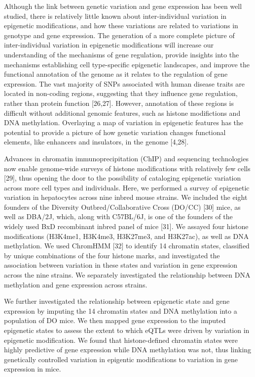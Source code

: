 \documentclass{bmcart}
\begin{document}
Although the link between genetic variation and gene expression has been
well studied, there is relatively little known about inter-individual
variation in epigenetic modifications, and how these variations are
related to variations in genotype and gene expression. The generation of
a more complete picture of inter-individual variation in epigenetic
modifications will increase our understanding of the mechanisms of gene
regulation, provide insights into the mechanisms establishing cell
type-specific epigenetic landscapes, and improve the functional
annotation of the genome as it relates to the regulation of gene
expression. The vast majority of SNPs associated with human disease
traits are located in non-coding regions, suggesting that they influence
gene regulation, rather than protein function {[}26,27{]}. However,
annotation of these regions is difficult without additional genomic
features, such as histone modifictions and DNA methylation. Overlaying a
map of variation in epigenetic features has the potential to provide a
picture of how genetic variation changes functional elements, like
enhancers and insulators, in the genome {[}4,28{]}.

Advances in chromatin immunoprecipitation (ChIP) and sequencing
technologies now enable genome-wide surveys of histone modifications
with relatively few cells {[}29{]}, thus opening the door to the
possibility of cataloging epigenetic variation across more cell types
and individuals. Here, we performed a survey of epigenetic variation in
hepatocytes across nine inbred mouse strains. We included the eight
founders of the Diversity Outbred/Collaborative Cross (DO/CC) {[}30{]}
mice, as well as DBA/2J, which, along with C57BL/6J, is one of the
founders of the widely used BxD recombinant inbred panel of mice
{[}31{]}. We assayed four histone modifications (H3K4me1, H3K4me3,
H3K27me3, and H3K27ac), as well as DNA methylation. We used ChromHMM
{[}32{]} to identify 14 chromatin states, classified by unique
combinations of the four histone marks, and investigated the association
between variation in these states and variation in gene expression
across the nine strains. We separately investigated the relationship
between DNA methylation and gene expression across strains.

We further investigated the relationship between epigenetic state and
gene expression by imputing the 14 chromatin states and DNA methylation
into a population of DO mice. We then mapped gene expression to the
imputed epigenetic states to assess the extent to which eQTLs were
driven by variation in epigenetic modification. We found that
histone-defined chromatin states were highly predictive of gene
expression while DNA methylation was not, thus linking genetically
controlled variation in epigentic modifications to variation in gene
expression in mice.
\end{document}
